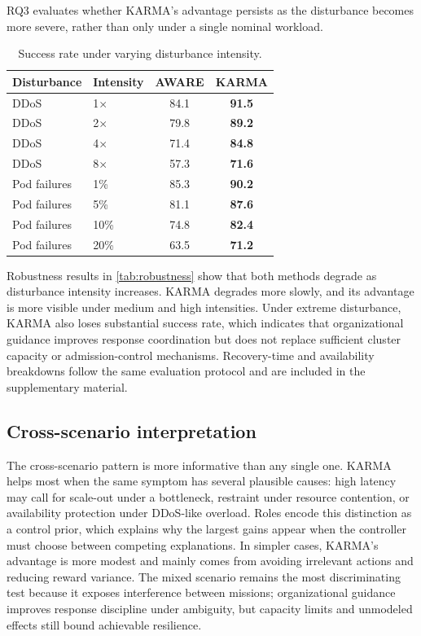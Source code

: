 \documentclass[journal]{IEEEtran}
\begin{document}
RQ3 evaluates whether KARMA's advantage persists as the disturbance becomes more severe, rather than only under a single nominal workload.
%
\begin{table}[t]
  \centering
  \caption{Success rate under varying disturbance intensity.}
  \label{tab:robustness}
  \scriptsize
  \setlength{\tabcolsep}{4pt}
  \begin{tabular}{llcc}
    \toprule
    \textbf{Disturbance} & \textbf{Intensity} & \textbf{AWARE} & \textbf{KARMA} \\
    \midrule
    DDoS                 & 1$\times$          & 84.1           & \textbf{91.5}  \\
    DDoS                 & 2$\times$          & 79.8           & \textbf{89.2}  \\
    DDoS                 & 4$\times$          & 71.4           & \textbf{84.8}  \\
    DDoS                 & 8$\times$          & 57.3           & \textbf{71.6}  \\
    \midrule
    Pod failures         & 1\%                & 85.3           & \textbf{90.2}  \\
    Pod failures         & 5\%                & 81.1           & \textbf{87.6}  \\
    Pod failures         & 10\%               & 74.8           & \textbf{82.4}  \\
    Pod failures         & 20\%               & 63.5           & \textbf{71.2}  \\
    \bottomrule
  \end{tabular}
\end{table}
%
Robustness results in \autoref{tab:robustness} show that both methods degrade as disturbance intensity increases. KARMA degrades more slowly, and its advantage is more visible under medium and high intensities. Under extreme disturbance, KARMA also loses substantial success rate, which indicates that organizational guidance improves response coordination but does not replace sufficient cluster capacity or admission-control mechanisms. Recovery-time and availability breakdowns follow the same evaluation protocol and are included in the supplementary material.

\subsection{Cross-scenario interpretation}

The cross-scenario pattern is more informative than any single one. KARMA helps most when the same symptom has several plausible causes: high latency may call for scale-out under a bottleneck, restraint under resource contention, or availability protection under DDoS-like overload. Roles encode this distinction as a control prior, which explains why the largest gains appear when the controller must choose between competing explanations. In simpler cases, KARMA's advantage is more modest and mainly comes from avoiding irrelevant actions and reducing reward variance. The mixed scenario remains the most discriminating test because it exposes interference between missions; organizational guidance improves response discipline under ambiguity, but capacity limits and unmodeled effects still bound achievable resilience.
\end{document}
